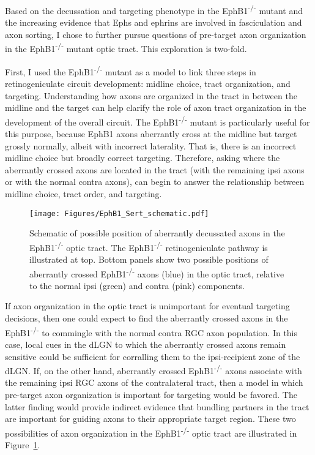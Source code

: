 \label{sec:BundleWidth}
Based on the decussation and targeting phenotype in the EphB1\textsuperscript{-/-} mutant and the increasing evidence that Ephs and ephrins are involved in fasciculation and axon sorting, I chose to further pursue questions of pre-target axon organization in the EphB1\textsuperscript{-/-} mutant optic tract.
This exploration is two-fold.

First, I used the EphB1\textsuperscript{-/-} mutant as a model to link three steps in retinogeniculate circuit development: midline choice, tract organization, and targeting.
Understanding how axons are organized in the tract in between the midline and the target can help clarify the role of axon tract organization in the development of the overall circuit.
The EphB1\textsuperscript{-/-} mutant is particularly useful for this purpose, because EphB1\textsupersciprt{-/-} axons aberrantly cross at the midline but target grossly normally, albeit with incorrect laterality.
That is, there is an incorrect midline choice but broadly correct targeting.
Therefore, asking where the aberrantly crossed axons are located in the tract (with the remaining ipsi axons or with the normal contra axons), can begin to answer the relationship between midline choice, tract order, and targeting.
\begin{figure}[hbtp]
    \begin{center}
        \texttt{[image: Figures/EphB1\_Sert\_schematic.pdf]}
        \caption[Schematic of possible position of aberrantly decussated axons in the EphB1\textsuperscript{-/-} optic tract.]
        {Schematic of possible position of aberrantly decussated axons in the EphB1\textsuperscript{-/-} optic tract.
		The EphB1\textsuperscript{-/-} retinogeniculate pathway is illustrated at top.
		Bottom panels show two possible positions of aberrantly crossed EphB1\textsuperscript{-/-} axons (blue) in the optic tract, relative to the normal ipsi (green) and contra (pink) components.
		}
        \label{EphB1Sertschematic}
    \end{center}
\end{figure}

If axon organization in the optic tract is unimportant for eventual targeting decisions, then one could expect to find the aberrantly crossed axons in the EphB1\textsuperscript{-/-} to commingle with the normal contra RGC axon population.
In this case, local cues in the dLGN to which the aberrantly crossed axons remain sensitive could be sufficient for corralling them to the ipsi-recipient zone of the dLGN.
If, on the other hand, aberrantly crossed EphB1\textsuperscript{-/-} axons associate with the remaining ipsi RGC axons of the contralateral tract, then a model in which pre-target axon organization is important for targeting would be favored.
The latter finding would provide indirect evidence that bundling partners in the tract are important for guiding axons to their appropriate target region.
These two possibilities of axon organization in the EphB1\textsuperscript{-/-} optic tract are illustrated in Figure~\ref{EphB1Sertschematic}.

